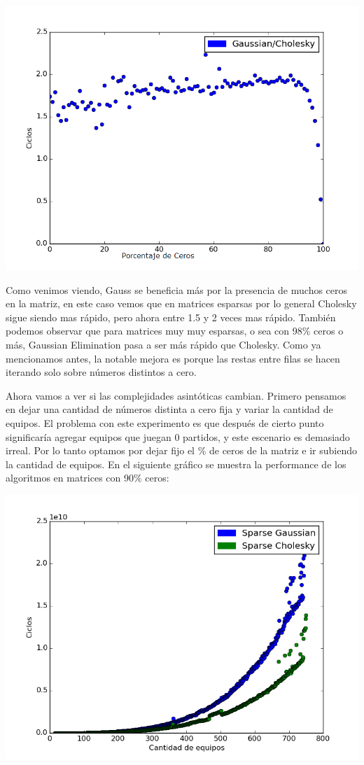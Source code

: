 \includegraphics[scale=0.7]{img/sparsegaussianvscholesky.png}
 
 Como venimos viendo, Gauss se beneficia más por la presencia de muchos ceros en la matriz, en este caso vemos que en matrices esparsas por lo general Cholesky sigue siendo mas rápido, pero ahora entre 1.5 y 2 veces mas rápido. También podemos observar que para matrices muy muy esparsas, o sea con 98$\%$ ceros o más, Gaussian Elimination pasa a ser más rápido que Cholesky. Como ya mencionamos antes, la notable mejora es porque las restas entre filas se hacen iterando solo sobre números distintos a cero.
 
 Ahora vamos a ver si las complejidades asintóticas cambian. Primero pensamos en dejar una cantidad de números distinta a cero fija y variar la cantidad de equipos. El problema con este experimento es que después de cierto punto significaría agregar equipos que juegan 0 partidos, y este escenario es demasiado irreal. Por lo tanto optamos por dejar fijo el $\%$ de ceros de la matriz e ir subiendo la cantidad de equipos. En el siguiente gráfico se muestra la performance de los algoritmos en matrices con 90$\%$ ceros:
 
 \includegraphics[scale=0.7]{img/testfixedsparse.png}

